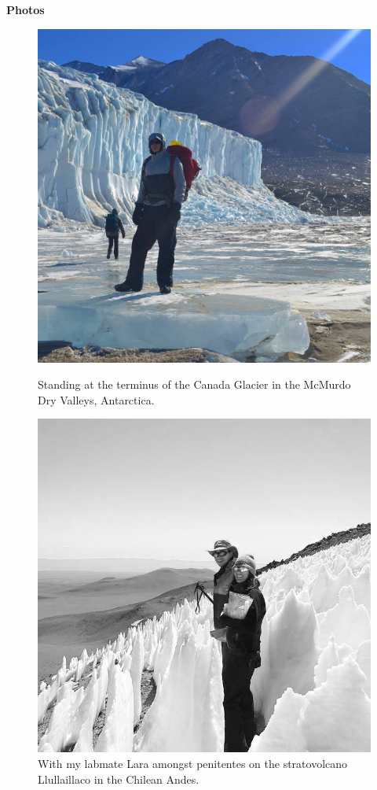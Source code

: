 \documentclass{article}
\begin{document}
\vspace{3mm}
\captionsetup[figure]{labelformat=empty} %
{\large  \textbf{Photos}}
\begin{figure}[H]
  \begin{minipage}{0.47\textwidth}
    \includegraphics[width=\linewidth]{pix/at_canada_term_2016.jpg}
    \caption{Standing at the terminus of the Canada Glacier in the McMurdo Dry Valleys, Antarctica.}
    \end{minipage}
  \hspace{\fill} %
  \begin{minipage}{0.47\textwidth}
    \includegraphics[width=\linewidth]{pix/penitentes_2016.jpg}
    \caption{With my labmate Lara amongst penitentes on the stratovolcano Llullaillaco in the Chilean Andes.}
    \end{minipage}
\end{figure}
\end{document}
